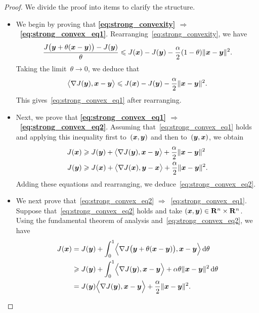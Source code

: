 \begin{proof}
    We divide the proof into items to clarify the structure.
    \begin{itemize}
        \item
    We begin by proving that \textbf{\eqref{eq:strong_convexity} $\Rightarrow$~\eqref{eq:strong_convex_eq1}}.
    Rearranging~\eqref{eq:strong_convexity}, we have
    \[
        \frac{J\bigl( \vect y + \theta (\vect x - \vect y) \bigr) - J(\vect y)}{\theta}
        \leq  J(\vect x)  - J(\vect y)  - \frac{\alpha}{2} (1 - \theta) \norm{\vect x - \vect y}^2.
    \]
    Taking the limit~$\theta \to 0$,
    we deduce that
    \[
        \ip[\big]{\nabla J(\vect y), \vect x - \vect y}
        \leq  J(\vect x)  - J(\vect y)  - \frac{\alpha}{2}  \norm{\vect x - \vect y}^2.
    \]
    This gives~\eqref{eq:strong_convex_eq1} after rearranging.

    \item
    Next, we prove that \textbf{\eqref{eq:strong_convex_eq1} $\Rightarrow$~\eqref{eq:strong_convex_eq2}}.
    Assuming that~\eqref{eq:strong_convex_eq1} holds and applying this inequality first to~$(\vect x, \vect y)$ and then to~$(\vect y, \vect x)$,
    we obtain
    \begin{align*}
        J(\vect x) &\geq J(\vect y) + \ip[\big]{\nabla J(\vect y), \vect x - \vect y} + \frac{\alpha}{2} \norm{\vect x - \vect y}^2 \\
        J(\vect y) &\geq J(\vect x) + \ip[\big]{\nabla J(\vect x), \vect y - \vect x} + \frac{\alpha}{2} \norm{\vect x - \vect y}^2.
    \end{align*}
    Adding these equations and rearranging,
    we deduce~\eqref{eq:strong_convex_eq2}.

    \item
    We next prove that~\eqref{eq:strong_convex_eq2} $\Rightarrow$~\eqref{eq:strong_convex_eq1}.
    Suppose that~\eqref{eq:strong_convex_eq2} holds and
    take $(\vect x, \vect y) \in \real^n \times \real^n$.
    Using the fundamental theorem of analysis and~\eqref{eq:strong_convex_eq2},
    we have
    \begin{align*}
        J(\vect x)
        &=  J(\vect y) + \int_{0}^{1} \ip[\Big]{\nabla J\bigl(\vect y + \theta (\vect x - \vect y) \bigr), \vect x - \vect y} \, \d \theta \\
        &\geq J(\vect y) + \int_{0}^{1} \ip[\Big]{\nabla J(\vect y), \vect x - \vect y} + \alpha \theta \norm{\vect x - \vect y}^2 \, \d \theta \\
        &= J(\vect y) \ip[\Big]{\nabla J(\vect y), \vect x - \vect y} + \frac{\alpha}{2} \norm{\vect x - \vect y}^2.
    \end{align*}


\end{itemize}
\end{proof}
